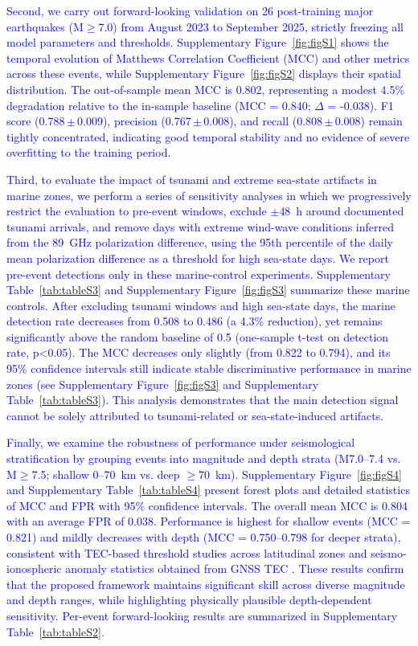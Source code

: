 \documentclass[preprint,review,12pt,authoryear]{elsarticle}
\providecommand{\DIFaddtex}[1]{{\sf #1}} %
\providecommand{\DIFadd}[1]{\texorpdfstring{\DIFaddtex{#1}}{#1}} %
\renewcommand{\DIFaddtex}[1]{\textcolor{blue}{#1}}
\begin{document}
\DIFadd{Second, we carry out forward-looking validation on 26 post-training major earthquakes (M$\ge$7.0) from August 2023 to September 2025, strictly freezing all model parameters and thresholds. Supplementary Figure~\ref{fig:figS1} shows the temporal evolution of Matthews Correlation Coefficient (MCC) and other metrics across these events, while Supplementary Figure~\ref{fig:figS2} displays their spatial distribution. The out-of-sample mean MCC is 0.802, representing a modest 4.5\% degradation relative to the in-sample baseline (MCC = 0.840; $\Delta$ = -0.038). F1 score (0.788\,$\pm$\,0.009), precision (0.767\,$\pm$\,0.008), and recall (0.808\,$\pm$\,0.008) remain tightly concentrated, indicating good temporal stability and no evidence of severe overfitting to the training period.
}

\DIFadd{Third, to evaluate the impact of tsunami and extreme sea-state artifacts in marine zones, we perform a series of sensitivity analyses in which we progressively restrict the evaluation to pre-event windows, exclude $\pm$48~h around documented tsunami arrivals, and remove days with extreme wind-wave conditions inferred from the 89~GHz polarization difference, using the 95th percentile of the daily mean polarization difference as a threshold for high sea-state days. We report pre-event detections only in these marine-control experiments. Supplementary Table~\ref{tab:tableS3} and Supplementary Figure~\ref{fig:figS3} summarize these marine controls. After excluding tsunami windows and high sea-state days, the marine detection rate decreases from 0.508 to 0.486 (a 4.3\% reduction), yet remains significantly above the random baseline of 0.5 (one-sample t-test on detection rate, p<0.05). The MCC decreases only slightly (from 0.822 to 0.794), and its 95\% confidence intervals still indicate stable discriminative performance in marine zones (see Supplementary Figure~\ref{fig:figS3} and Supplementary Table~\ref{tab:tableS3}). This analysis demonstrates that the main detection signal cannot be solely attributed to tsunami-related or sea-state-induced artifacts.
}

\DIFadd{Finally, we examine the robustness of performance under seismological stratification by grouping events into magnitude and depth strata (M7.0--7.4 vs. M$\ge$7.5; shallow 0--70~km vs. deep $\ge$70~km). Supplementary Figure~\ref{fig:figS4} and Supplementary Table~\ref{tab:tableS4} present forest plots and detailed statistics of MCC and FPR with 95\% confidence intervals. The overall mean MCC is 0.804 with an average FPR of 0.038. Performance is highest for shallow events (MCC = 0.821) and mildly decreases with depth (MCC = 0.750--0.798 for deeper strata), consistent with TEC-based threshold studies across latitudinal zones and seismo-ionospheric anomaly statistics obtained from GNSS TEC \citep{shahJin2015,shahTotalElectronContent2020,shahASR2022}. These results confirm that the proposed framework maintains significant skill across diverse magnitude and depth ranges, while highlighting physically plausible depth-dependent sensitivity. Per-event forward-looking results are summarized in Supplementary Table~\ref{tab:tableS2}.
}
\end{document}
